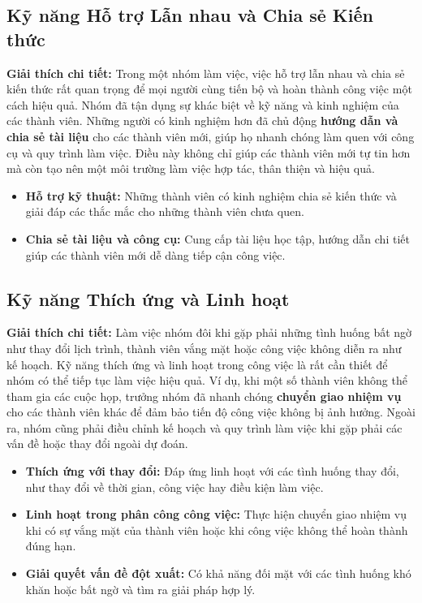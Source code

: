 \documentclass[a4paper,12pt]{article}
\begin{document}
\subsection{Kỹ năng Hỗ trợ Lẫn nhau và Chia sẻ Kiến thức}
\textbf{Giải thích chi tiết:}  
Trong một nhóm làm việc, việc hỗ trợ lẫn nhau và chia sẻ kiến thức rất quan trọng để mọi người cùng tiến bộ và hoàn thành công việc một cách hiệu quả. Nhóm đã tận dụng sự khác biệt về kỹ năng và kinh nghiệm của các thành viên. Những người có kinh nghiệm hơn đã chủ động \textbf{hướng dẫn và chia sẻ tài liệu} cho các thành viên mới, giúp họ nhanh chóng làm quen với công cụ và quy trình làm việc. Điều này không chỉ giúp các thành viên mới tự tin hơn mà còn tạo nên một môi trường làm việc hợp tác, thân thiện và hiệu quả.
\begin{itemize}
    \item \textbf{Hỗ trợ kỹ thuật:} Những thành viên có kinh nghiệm chia sẻ kiến thức và giải đáp các thắc mắc cho những thành viên chưa quen.
    \item \textbf{Chia sẻ tài liệu và công cụ:} Cung cấp tài liệu học tập, hướng dẫn chi tiết giúp các thành viên mới dễ dàng tiếp cận công việc.
\end{itemize}

\subsection{Kỹ năng Thích ứng và Linh hoạt}
\textbf{Giải thích chi tiết:}  
Làm việc nhóm đôi khi gặp phải những tình huống bất ngờ như thay đổi lịch trình, thành viên vắng mặt hoặc công việc không diễn ra như kế hoạch. Kỹ năng thích ứng và linh hoạt trong công việc là rất cần thiết để nhóm có thể tiếp tục làm việc hiệu quả. Ví dụ, khi một số thành viên không thể tham gia các cuộc họp, trưởng nhóm đã nhanh chóng \textbf{chuyển giao nhiệm vụ} cho các thành viên khác để đảm bảo tiến độ công việc không bị ảnh hưởng. Ngoài ra, nhóm cũng phải điều chỉnh kế hoạch và quy trình làm việc khi gặp phải các vấn đề hoặc thay đổi ngoài dự đoán.
\begin{itemize}
    \item \textbf{Thích ứng với thay đổi:} Đáp ứng linh hoạt với các tình huống thay đổi, như thay đổi về thời gian, công việc hay điều kiện làm việc.
    \item \textbf{Linh hoạt trong phân công công việc:} Thực hiện chuyển giao nhiệm vụ khi có sự vắng mặt của thành viên hoặc khi công việc không thể hoàn thành đúng hạn.
    \item \textbf{Giải quyết vấn đề đột xuất:} Có khả năng đối mặt với các tình huống khó khăn hoặc bất ngờ và tìm ra giải pháp hợp lý.
\end{itemize}
\end{document}
